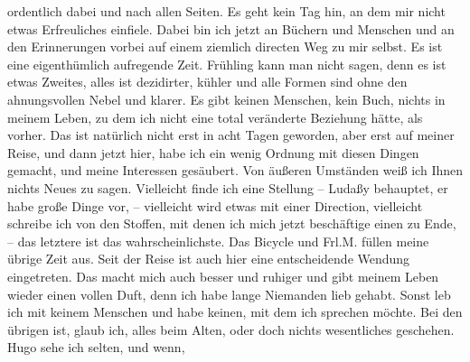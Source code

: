 \begin{ledgroupsized}[t]{13cm}
               ordentlich dabei {\pb}und nach
               allen Seiten. Es geht kein Tag hin, an dem mir nicht etwas Erfreuliches einfiele.
               Dabei bin ich jetzt an Büchern und Menschen und an den Erinnerungen vorbei auf einem
               ziemlich directen Weg zu mir selbst. Es ist eine eigenthümlich aufregende Zeit.
               Frühling kann man nicht sagen, denn es ist etwas Zweites, alles ist dezidirter,
               kühler und alle Formen sind ohne den ahnungsvollen Nebel und klarer. Es gibt keinen
               Menschen, kein Buch, nichts in meinem Leben, zu dem ich nicht eine total veränderte
               Beziehung hätte, als vorher. Das ist natürlich nicht erst in acht Tagen geworden,
               aber erst auf meiner Reise, und dann jetzt hier, habe ich ein wenig Ordnung mit
               diesen Dingen gemacht, und meine Interessen gesäubert. \pend
           \pstart
           Von äußeren Umständen weiß ich Ihnen {\pb}nichts Neues zu sagen.
               Vielleicht finde ich eine Stellung – Ludaßy
               behauptet, er habe große Dinge vor, – vielleicht wird etwas mit einer Direction,
               vielleicht schreibe ich von den Stoffen, mit denen ich mich jetzt beschäftige einen
               zu Ende, – das letztere ist das wahrscheinlichste. Das Bicycle und Frl.M. füllen meine übrige Zeit aus. Seit der Reise
               ist auch hier eine entscheidende Wendung eingetreten. Das macht mich auch besser und
               ruhiger und gibt meinem Leben wieder einen vollen Duft, denn ich habe lange Niemanden
               lieb gehabt. Sonst leb ich mit keinem Menschen und habe keinen, mit dem ich sprechen
               möchte. \pend
           \pstart
           Bei den übrigen ist, glaub ich, alles beim Alten, oder doch nichts wesentliches
               geschehen. Hugo sehe ich selten, und wenn,

\end{ledgroupsized}
